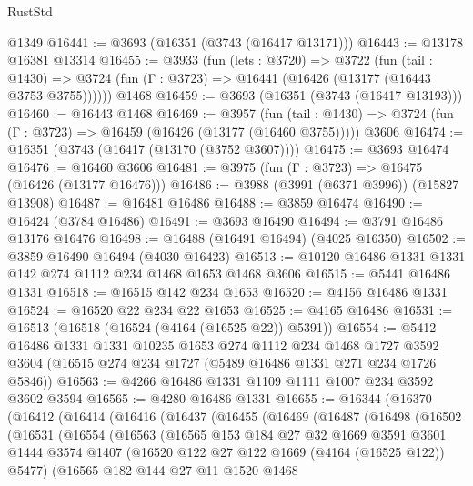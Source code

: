 \begin{lexlean}{RustStd}
\begin{coremodule}
    @1349
@16441 := @3693 (@16351 (@3743 (@16417 @13171)))
@16443 := @13178 @16381 @13314
@16455 := @3933
    (fun (lets : @3720) =>
    @3722
      (fun (tail : @1430) =>
      @3724 (fun (Γ : @3723) => @16441 (@16426 (@13177 (@16443 @3753 @3755))))))
    @1468
@16459 := @3693 (@16351 (@3743 (@16417 @13193)))
@16460 := @16443 @1468
@16469 := @3957
    (fun (tail : @1430) => @3724 (fun (Γ : @3723) => @16459 (@16426 (@13177 (@16460 @3755)))))
    @3606
@16474 := @16351 (@3743 (@16417 (@13170 (@3752 @3607))))
@16475 := @3693 @16474
@16476 := @16460 @3606
@16481 := @3975 (fun (Γ : @3723) => @16475 (@16426 (@13177 @16476)))
@16486 := @3988 (@3991 (@6371 @3996)) (@15827 @13908)
@16487 := @16481 @16486
@16488 := @3859 @16474
@16490 := @16424 (@3784 @16486)
@16491 := @3693 @16490
@16494 := @3791 @16486 @13176 @16476
@16498 := @16488 (@16491 @16494) (@4025 @16350)
@16502 := @3859 @16490 @16494 (@4030 @16423)
@16513 := @10120 @16486 @1331 @1331 @142 @274 @1112 @234 @1468 @1653 @1468 @3606
@16515 := @5441 @16486 @1331
@16518 := @16515 @142 @234 @1653
@16520 := @4156 @16486 @1331
@16524 := @16520 @22 @234 @22 @1653
@16525 := @4165 @16486
@16531 := @16513 (@16518 (@16524 (@4164 (@16525 @22)) @5391))
@16554 := @5412
    @16486
    @1331
    @1331
    @10235
    @1653
    @274
    @1112
    @234
    @1468
    @1727
    @3592
    @3604
    (@16515 @274 @234 @1727 (@5489 @16486 @1331 @271 @234 @1726 @5846))
@16563 := @4266 @16486 @1331 @1109 @1111 @1007 @234 @3592 @3602 @3594
@16565 := @4280 @16486 @1331
@16655 := @16344
    (@16370
      (@16412
        (@16414
          (@16416
            (@16437
              (@16455
                (@16469
                  (@16487
                    (@16498
                      (@16502
                        (@16531
                          (@16554
                            (@16563
                              (@16565
                                @153
                                @184
                                @27
                                @32
                                @1669
                                @3591
                                @3601
                                @1444
                                @3574
                                @1407
                                (@16520 @122 @27 @122 @1669 (@4164 (@16525 @122)) @5477)
                                (@16565
                                  @182
                                  @144
                                  @27
                                  @11
                                  @1520
                                  @1468

\end{coremodule}
\end{lexlean}

